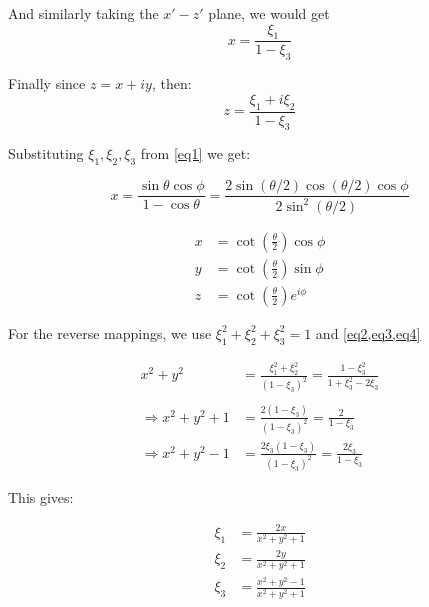 \documentclass[12pt, letterpaper]{book}
\begin{document}
And similarly taking the $x'-z'$ plane, we would get \begin{equation} x= \frac{\xi_1}{1-\xi_3} \label{eq3}\end{equation}

Finally since $z= x+iy$, then: \begin{equation}z= \frac{\xi_1+i\xi_2}{1-\xi_3}\label{eq4}\end{equation}

Substituting $\xi_1, \xi_2, \xi_3$ from \cref{eq1} we get:

\begin{equation*}
    x = \frac{\sin\theta\cos\phi}{1-\cos\theta}=\frac{2\sin\left(\theta/2\right)\cos\left(\theta/2\right)\cos\phi}{2\sin^2\left(\theta/2\right)}
\end{equation*}

\begin{equation}
    \begin{aligned}
        x &= \cot\left(\frac{\theta}{2}\right)\cos\phi\\
        y &= \cot\left(\frac{\theta}{2}\right)\sin\phi\\
        z &= \cot\left(\frac{\theta}{2}\right)e^{i\phi}
    \end{aligned}
\end{equation}

For the reverse mappings, we use $\xi_1^2+\xi_2^2+\xi_3^2=1$ and \cref{eq2,eq3,eq4}

\begin{equation*}
\begin{split}
    x^2+y^2 &= \frac{\xi_1^2+\xi_2^2}{(1-\xi_3)^2}= \frac{1-\xi_3^2}{1+\xi_3^2-2\xi_3}\\\\
    \Rightarrow x^2+y^2+1 &= \frac{2(1-\xi_3)}{(1-\xi_3)^2}= \frac{2}{1-\xi_3}\\
    \Rightarrow x^2+y^2-1 &= \frac{2\xi_3(1-\xi_3)}{(1-\xi_3)^2}= \frac{2\xi_3}{1-\xi_3}
\end{split}
\end{equation*}

This gives:

\begin{equation}
    \begin{aligned}
        \xi_1 &= \frac{2x}{x^2+y^2+1}\\
        \xi_2 &= \frac{2y}{x^2+y^2+1}\\
        \xi_3 &= \frac{x^2+y^2-1}{x^2+y^2+1}\\
    \end{aligned}        
\end{equation}
\end{document}

